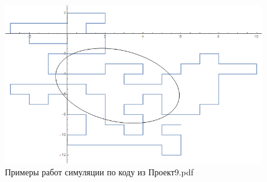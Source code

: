 \begin{figure}
\begin{minipage}[h]{0.5\linewidth}
\end{minipage}
\hfill
\begin{minipage}[h]{0.5\linewidth}
    \includegraphics[width=\linewidth]{Sections/Images/GyrationEllipse4.png}
\end{minipage}
    \caption{Примеры работ симуляции по коду из Проект9.pdf\cite{Git}}
    \label{fig:my_label}
\end{figure}

